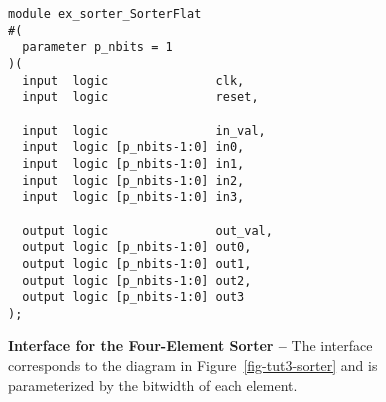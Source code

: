 
\begin{figure}

  \hspace{-0.25in}
  \begin{minipage}[t]{0.45\tw}
\begin{lstlisting}
module ex_sorter_SorterFlat
#(
  parameter p_nbits = 1
)(
  input  logic               clk,
  input  logic               reset,

  input  logic               in_val,
  input  logic [p_nbits-1:0] in0,
  input  logic [p_nbits-1:0] in1,
  input  logic [p_nbits-1:0] in2,
  input  logic [p_nbits-1:0] in3,

  output logic               out_val,
  output logic [p_nbits-1:0] out0,
  output logic [p_nbits-1:0] out1,
  output logic [p_nbits-1:0] out2,
  output logic [p_nbits-1:0] out3
);
\end{lstlisting}
  \end{minipage}%
  \hfill%
  \begin{minipage}[t]{0.47\tw}
  \caption{\textbf{Interface for the Four-Element Sorter --} The
    interface corresponds to the diagram in Figure~\ref{fig-tut3-sorter}
    and is parameterized by the bitwidth of each element.}
  \label{code-tut3-sorter-ifc}
  \end{minipage}%
  \hspace*{0.1in}\mbox{}

\end{figure}

